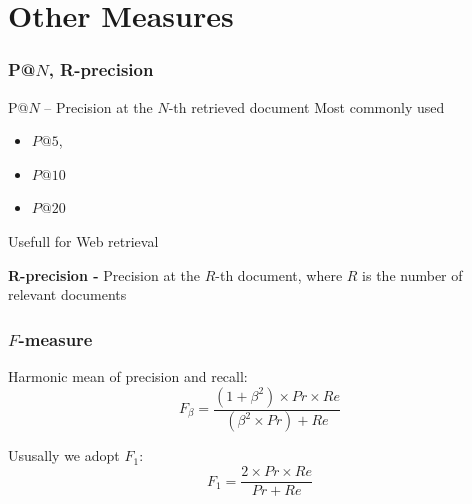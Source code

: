 \documentclass[svgnames]{beamer}
\begin{document}
\section{Other Measures}

\begin{frame}
  \frametitle{P@$N$, R-precision }
  
  \begin{block}{P@$N$ -- Precision at the $N$-th retrieved document}
    Most commonly used 
  \begin{itemize}
    \item $P@5$, 
    \item $P@10$ 
    \item $P@20$
  \end{itemize}
  Usefull for Web retrieval
  \end{block}

  \begin{block}{}
\textbf{R-precision -} Precision at the $R$-th document, where $R$ is
      the number of relevant documents
  \end{block}

\end{frame}

\begin{frame}
  \frametitle{$F$-measure }
  \begin{block}{Harmonic mean of precision and recall:}
      \begin{displaymath}
        F_\beta = \frac{(1 + \beta^2) \times Pr \times Re}{(\beta^2 \times Pr) + Re}
    \end{displaymath}
  \end{block}

  \begin{block}{Ususally we adopt $F_1$:}
      \begin{displaymath}
        F_1 = \frac{2 \times Pr \times Re}{Pr + Re}
    \end{displaymath}
  \end{block}
\end{frame}
\end{document}

